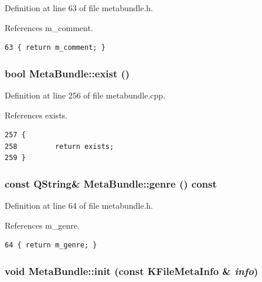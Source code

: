 Definition at line 63 of file metabundle.h.

References m\_\-comment.



\footnotesize\begin{verbatim}63 { return m_comment; }
\end{verbatim}\normalsize 
{}
\subsubsection{\setlength{\rightskip}{0pt plus 5cm}bool Meta\-Bundle::exist ()}\label{classMetaBundle_MetaBundlea8}




Definition at line 256 of file metabundle.cpp.

References exists.



\footnotesize\begin{verbatim}257 {
258         return exists;
259 }\end{verbatim}\normalsize 
{}
\subsubsection{\setlength{\rightskip}{0pt plus 5cm}const QString\& Meta\-Bundle::genre () const\hspace{0.3cm}{\tt  [inline]}}\label{classMetaBundle_MetaBundlea15}




Definition at line 64 of file metabundle.h.

References m\_\-genre.



\footnotesize\begin{verbatim}64 { return m_genre; }
\end{verbatim}\normalsize 
{}
\subsubsection{\setlength{\rightskip}{0pt plus 5cm}void Meta\-Bundle::init (const KFile\-Meta\-Info \& {\em info})\hspace{0.3cm}{\tt  [private]}}\label{classMetaBundle_MetaBundled1}




